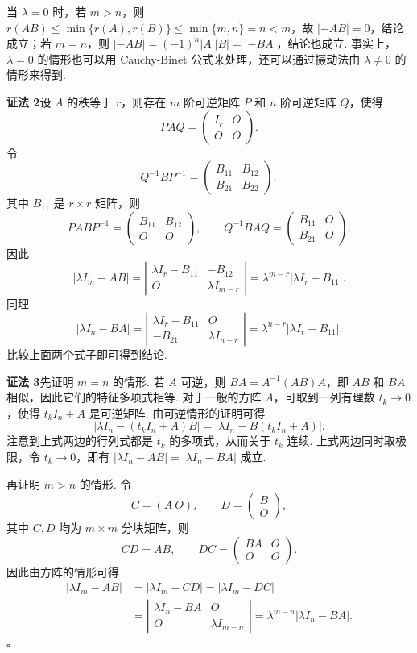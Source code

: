 \documentclass[UTF8,12pt,a4paper,fontset=fandol]{ctexart}
\begin{document}
当 $\lambda=0$ 时，若 $m>n$，则 $r(AB)\le \min\{r(A),r(B)\}\le \min\{m,n\}=n<m$，故 $|-AB|=0$，结论成立；若 $m=n$，则 $|-AB|=(-1)^n|A||B|=|-BA|$，结论也成立. 事实上，$\lambda=0$ 的情形也可以用 Cauchy-Binet 公式来处理，还可以通过摄动法由 $\lambda\ne 0$ 的情形来得到.

\noindent\textbf{证法 2}\quad 设 $A$ 的秩等于 $r$，则存在 $m$ 阶可逆矩阵 $P$ 和 $n$ 阶可逆矩阵 $Q$，使得
\[
PAQ=\left(\begin{array}{cc}
I_r & O\\
O & O
\end{array}\right).
\]
令
\[
Q^{-1}BP^{-1}=\left(\begin{array}{cc}
B_{11} & B_{12}\\
B_{21} & B_{22}
\end{array}\right),
\]
其中 $B_{11}$ 是 $r\times r$ 矩阵，则
\[
PABP^{-1}=\left(\begin{array}{cc}
B_{11} & B_{12}\\
O & O
\end{array}\right),\qquad
Q^{-1}BAQ=\left(\begin{array}{cc}
B_{11} & O\\
B_{21} & O
\end{array}\right).
\]
因此
\[
|\lambda I_m-AB|
=\left|\begin{array}{cc}
\lambda I_r-B_{11} & -B_{12}\\
O & \lambda I_{m-r}
\end{array}\right|
=\lambda^{m-r}|\lambda I_r-B_{11}|.
\]
同理
\[
|\lambda I_n-BA|
=\left|\begin{array}{cc}
\lambda I_r-B_{11} & O\\
-B_{21} & \lambda I_{n-r}
\end{array}\right|
=\lambda^{n-r}|\lambda I_r-B_{11}|.
\]
比较上面两个式子即可得到结论.

\noindent\textbf{证法 3}\quad 先证明 $m=n$ 的情形. 若 $A$ 可逆，则 $BA=A^{-1}(AB)A$，即 $AB$ 和 $BA$ 相似，因此它们的特征多项式相等. 对于一般的方阵 $A$，可取到一列有理数 $t_k\to 0$，使得 $t_kI_n+A$ 是可逆矩阵. 由可逆情形的证明可得
\[
|\lambda I_n-(t_kI_n+A)B|=|\lambda I_n-B(t_kI_n+A)|.
\]
注意到上式两边的行列式都是 $t_k$ 的多项式，从而关于 $t_k$ 连续. 上式两边同时取极限，令 $t_k\to 0$，即有 $|\lambda I_n-AB|=|\lambda I_n-BA|$ 成立.

再证明 $m>n$ 的情形. 令
\[
C=(A\ O),\qquad D=\left(\begin{array}{c}
B\\
O
\end{array}\right),
\]
其中 $C,D$ 均为 $m\times m$ 分块矩阵，则
\[
CD=AB,\qquad DC=\left(\begin{array}{cc}
BA & O\\
O & O
\end{array}\right).
\]
因此由方阵的情形可得
\[
\begin{aligned}
|\lambda I_m-AB|
&=|\lambda I_m-CD|=|\lambda I_m-DC|\\
&=\left|\begin{array}{cc}
\lambda I_n-BA & O\\
O & \lambda I_{m-n}
\end{array}\right|
=\lambda^{m-n}|\lambda I_n-BA|.
\end{aligned}
\]
$\square$
\end{document}
